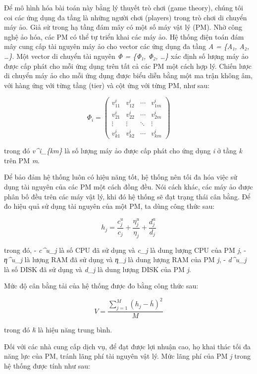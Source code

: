 \documentclass[
  vietnamese,
]{article}
\begin{document}
Để mô hình hóa bài toán này bằng lý thuyết trò chơi (game theory), chúng
tôi coi các ứng dụng đa tầng là những người chơi (players) trong trò
chơi di chuyển máy ảo. Giả sử trong hạ tầng đám mây có một số máy vật lý
(PM). Nhờ công nghệ ảo hóa, các PM có thể tự triển khai các máy ảo. Hệ
thống điện toán đám mây cung cấp tài nguyên máy ảo cho vector các ứng
dụng đa tầng \emph{A = \{A₁, A₂, \ldots\}}. Một vector di chuyển tài
nguyên \emph{Φ = \{Φ₁, Φ₂, \ldots\}} xác định số lượng máy ảo được cấp
phát cho mỗi ứng dụng trên tất cả các PM một cách hợp lý. Chiến lược di
chuyển máy ảo cho mỗi ứng dụng được biểu diễn bằng một ma trận không âm,
với hàng ứng với từng tầng (tier) và cột ứng với từng PM, như sau:

\[\Phi_i = \begin{pmatrix} v^i_{11} & v^i_{12} & \cdots & v^i_{1m} \\ v^i_{21} & v^i_{22} & \cdots & v^i_{2m} \\ \vdots & \vdots & \ddots & \vdots \\ v^i_{k1} & v^i_{k2} & \cdots & v^i_{km} \end{pmatrix} \tag{10}\]

trong đó \emph{v\^{}i\_\{km\}} là số lượng máy ảo được cấp phát cho ứng
dụng \emph{i} ở tầng \emph{k} trên PM \emph{m}.

Để bảo đảm hệ thống luôn có hiệu năng tốt, hệ thống nên tối đa hóa việc
sử dụng tài nguyên của các PM một cách đồng đều. Nói cách khác, các máy
ảo được phân bố đều trên các máy vật lý, khi đó hệ thống sẽ đạt trạng
thái cân bằng. Để đo hiệu quả sử dụng tài nguyên của một PM, ta dùng
công thức sau:

\[h_j = \frac{c^u_j}{c_j} + \frac{\eta^u_j}{\eta_j} + \frac{d^u_j}{d_j} \tag{11}\]

trong đó, - \emph{c\^{}u\_j} là số CPU đã sử dụng và \emph{c\_j} là dung
lượng CPU của PM \emph{j}, - \emph{η\^{}u\_j} là lượng RAM đã sử dụng và
\emph{η\_j} là dung lượng RAM của PM \emph{j}, - \emph{d\^{}u\_j} là số
DISK đã sử dụng và \emph{d\_j} là dung lượng DISK của PM \emph{j}.

Mức độ cân bằng tải của hệ thống được đo bằng công thức sau:

\[V = \frac{\sum_{j=1}^{M} (h_j - \bar{h})^2}{M} \tag{12}\]

trong đó \emph{h̄} là hiệu năng trung bình.

Đối với các nhà cung cấp dịch vụ, để đạt được lợi nhuận cao, họ khai
thác tối đa năng lực của PM, tránh lãng phí tài nguyên vật lý. Mức lãng
phí của PM \emph{j} trong hệ thống được tính như sau:
\end{document}
